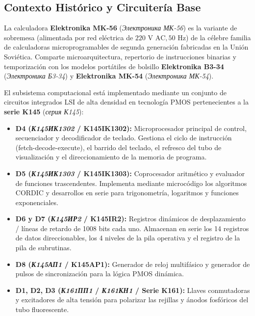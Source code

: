 \documentclass[11pt,a4paper]{article}
\begin{document}
\subsection{Contexto Histórico y Circuitería Base}
La calculadora \textbf{Elektronika MK-56} (\textit{Электроника МК-56}) es la variante de sobremesa (alimentada por red eléctrica de $220\text{ V AC}, 50\text{ Hz}$) de la célebre familia de calculadoras microprogramables de segunda generación fabricadas en la Unión Soviética. Comparte microarquitectura, repertorio de instrucciones binarias y temporización con los modelos portátiles de bolsillo \textbf{Elektronika B3-34} (\textit{Электроника Б3-34}) y \textbf{Elektronika MK-54} (\textit{Электроника МК-54}).

El subsistema computacional está implementado mediante un conjunto de circuitos integrados LSI de alta densidad en tecnología PMOS pertenecientes a la \textbf{serie K145} (\textit{серия К145}):
\begin{itemize}
    \item \textbf{D4 (\textit{К145ИК1302} / K145IK1302):} Microprocesador principal de control, secuenciador y decodificador de teclado. Gestiona el ciclo de instrucción (fetch-decode-execute), el barrido del teclado, el refresco del tubo de visualización y el direccionamiento de la memoria de programa.
    \item \textbf{D5 (\textit{К145ИК1303} / K145IK1303):} Coprocesador aritmético y evaluador de funciones trascendentes. Implementa mediante microcódigo los algoritmos CORDIC y desarrollos en serie para trigonometría, logaritmos y funciones exponenciales.
    \item \textbf{D6 y D7 (\textit{К145ИР2} / K145IR2):} Registros dinámicos de desplazamiento / líneas de retardo de 1008 bits cada uno. Almacenan en serie los 14 registros de datos direccionables, los 4 niveles de la pila operativa y el registro de la pila de subrutinas.
    \item \textbf{D8 (\textit{К145АП1} / K145AP1):} Generador de reloj multifásico y generador de pulsos de sincronización para la lógica PMOS dinámica.
    \item \textbf{D1, D2, D3 (\textit{К161ПП1} / \textit{К161КН1} / Serie K161):} Llaves conmutadoras y excitadores de alta tensión para polarizar las rejillas y ánodos fosfóricos del tubo fluorescente.
\end{itemize}
\end{document}
